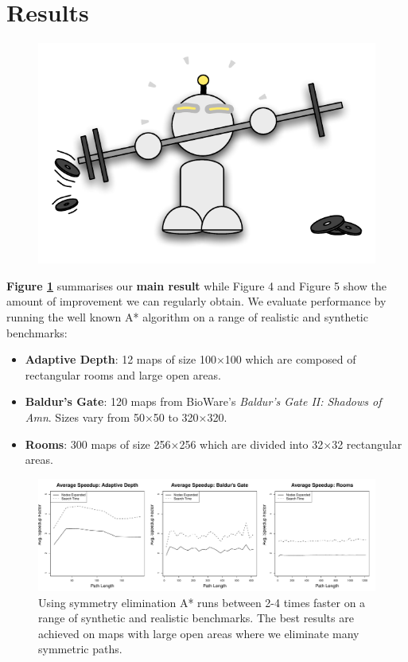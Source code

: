 \section{Results}

 \begin{figure}
    	\includegraphics[width=0.25\columnwidth, trim=0mm 10mm 0mm 0mm]{diagrams/robot_weights.pdf}
 \end{figure}
\textbf{Figure \ref{fig:speedup}} summarises our \textbf{main result} while Figure
4 and Figure 5 show the amount of improvement we
can regularly obtain. We evaluate performance by running the well known A* algorithm on a range of realistic and synthetic benchmarks:
\begin{itemize}
\item{
\textbf{Adaptive Depth}: 12 maps of size 100$\times$100 which are composed of
rectangular rooms and large open areas.
}
\item{
\textbf{Baldur's Gate}: 120 maps from BioWare's \emph{Baldur's Gate II: Shadows
of Amn}. Sizes vary from 50$\times$50 to 320$\times$320.
}
\item{
\textbf{Rooms}: 300 maps of size 256$\times$256 which are divided into 32$\times$32
rectangular areas. 
}
\end{itemize}


\begin{figure}[h]
\vspace{1em}
\label{fig:speedup}
\begin{center}
\includegraphics[width=\columnwidth]{diagrams/speedup}
\caption{Using symmetry elimination A* runs between 2-4 times faster on a range of synthetic
and realistic benchmarks.
The best results are achieved on maps with large open areas where we eliminate
many symmetric paths.}
\end{center}
\end{figure}

